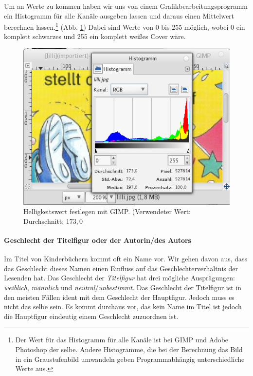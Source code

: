 Um an Werte zu kommen haben wir uns von einem Grafikbearbeitungsprogramm
ein Histogramm für alle Kanäle ausgeben lassen und daraus einen
Mittelwert berechnen
lassen.\footnote{Der Wert für das Histogramm für alle Kanäle ist bei GIMP und Adobe Photoshop der selbe. Andere Histogramme, die bei der Berechnung das Bild in ein Graustufenbild umwandeln geben Programmabhängig unterschiedliche Werte aus.}
(Abb. \ref{histogramm}) Dabei sind Werte von 0 bis 255 möglich, wobei 0
ein komplett schwarzes und 255 ein komplett weißes Cover wäre.

\begin{figure}
\center
\includegraphics{grafiken/hist.png}
  \caption[Helligkeitswert festlegen mit GIMP]{Helligkeitswert festlegen mit GIMP. (Verwendeter Wert: Durchschnitt: $173{,}0$}
  \label{histogramm}
\end{figure}

\paragraph{Geschlecht der Titelfigur oder der Autorin/des Autors}

Im Titel von Kinderbüchern kommt oft ein Name vor. Wir gehen davon aus,
dass das Geschlecht dieses Namen einen Einfluss auf das
Geschlechterverhältnis der Lesenden hat. Das Geschlecht der
\emph{Titelfigur} hat drei mögliche Ausprägungen: \emph{weiblich},
\emph{männlich} und \emph{neutral}/\emph{unbestimmt}. Das Geschlecht der
Titelfigur ist in den meisten Fällen ident mit dem Geschlecht der
Hauptfigur. Jedoch muss es nicht das selbe sein. Es kommt durchaus vor,
das kein Name im Titel ist jedoch die Hauptfigur eindeutig einem
Geschlecht zuzuordnen ist.

